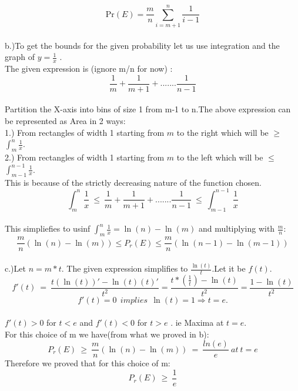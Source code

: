 \documentclass[12pt]{article}
\begin{document}
\[
\text{Pr}(E) = \frac{m}{n} \sum_{i=m+1}^{n} \frac{1}{i-1}
\]
\\
b.)To get the bounds for the given probability let us use integration and the graph of $y = \frac{1}{x} $ .\\
The given expression is (ignore m/n for now) :
\begin{equation*}
  \frac{1}{m}+\frac{1}{m+1}+ ....... \frac{1}{n-1}  
\end{equation*}
\\
Partition the X-axis into bins of size 1 from m-1 to n.The above expression can be represented as Area in 2 ways:\\
1.) From rectangles of width 1 starting from $m$ to the right which will be $\geq$ $\int_{m}^{n}\frac{1}{x}$.\\
2.) From rectangles of width 1 starting from $m$ to the left which will be $\leq$ $\int_{m-1}^{n-1}\frac{1}{x}$.\\
This is because of the strictly decreasing nature of the function chosen.
\begin{equation}
    \int_{m}^{n}\frac{1}{x}\ \leq\ \frac{1}{m}+\frac{1}{m+1}+ ....... \frac{1}{n-1}\ \leq\ \int_{m-1}^{n-1}\frac{1}{x}
\end{equation}
\\
This simpliefies to usinf $\int_m^n\frac{1}{x} = \ln(n)-\ln(m)$ and multiplying with $\frac{m}{n}$:
\begin{equation*}
    \frac{m}{n} (\ln(n) - \ln(m)) \leq P_r(E) \leq \frac{m}{n} (\ln(n-1) - \ln(m-1))
\end{equation*}
\\
c.)Let $n=m*t$. The given expression simplifies to $\frac{\ln(t)}{t}$.Let it be $f(t)$.
\begin{equation}
    f'(t)\ =\ \frac{t(\ln(t))'-\ln(t)(t)'}{t^2} = \frac{t*(\frac{1}{t})-\ln(t)}{t^2} = \frac{1-\ln(t)}{t^2}
\end{equation}
\begin{equation*}
    f'(t) = 0\ \ implies\ \ \ln(t)=1 \Rightarrow t = e.
\end{equation*}
\\
$f'(t)>0$ for $t<e$ and $f'(t)<0$ for $t>e$ . ie Maxima at $t=e$. \\
For this choice of m we have(from what we proved in b):
\begin{equation}
    P_r(E)\ \geq\ \frac{m}{n} (\ln(n) - \ln(m))\ =\ \frac{ln(e)}{e}\ at\ t=e
\end{equation}
Therefore we proved that for this choice of m:
\begin{equation*}
    P_r(E)\ \geq\ \frac{1}{e}
\end{equation*}
\newpage
\end{document}
